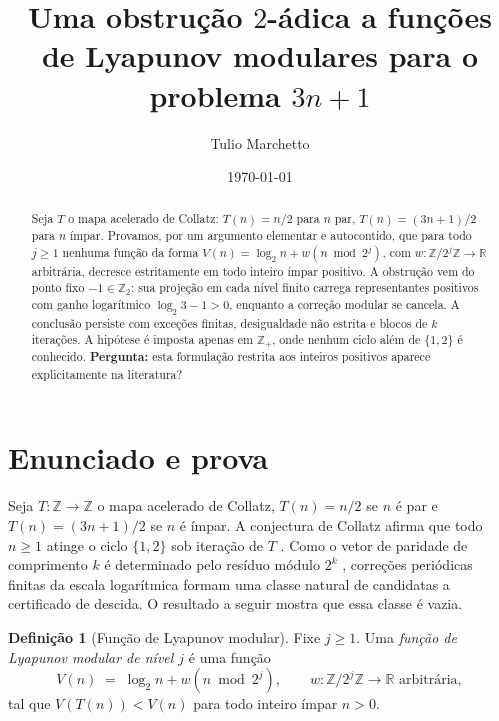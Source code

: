 \documentclass[10pt]{amsart}
\theoremstyle{definition}
\newtheorem{definition}[theorem]{Definição}
\theoremstyle{remark}
\newcommand{\Z}{\mathbb{Z}}
\newcommand{\R}{\mathbb{R}}
\begin{document}
\title[Obstrução $2$-ádica a funções de Lyapunov modulares]{Uma obstrução $2$-ádica a funções de Lyapunov modulares para o problema $3n+1$}

\author{Tulio Marchetto}

\date{\today}

\begin{abstract}
Seja $T$ o mapa acelerado de Collatz: $T(n)=n/2$ para $n$ par, $T(n)=(3n+1)/2$ para $n$ ímpar. Provamos, por um argumento elementar e autocontido, que para todo $j\ge 1$ nenhuma função da forma $V(n)=\log_2 n+w(n\bmod 2^j)$, com $w:\Z/2^j\Z\to\R$ arbitrária, decresce estritamente em todo inteiro ímpar positivo. A obstrução vem do ponto fixo $-1\in\Z_2$: sua projeção em cada nível finito carrega representantes positivos com ganho logarítmico $\log_2 3-1>0$, enquanto a correção modular se cancela. A conclusão persiste com exceções finitas, desigualdade não estrita e blocos de $k$ iterações. A hipótese é imposta apenas em $\Z_+$, onde nenhum ciclo além de $\{1,2\}$ é conhecido. \textbf{Pergunta:} esta formulação restrita aos inteiros positivos aparece explicitamente na literatura?
\end{abstract}

\maketitle

\section{Enunciado e prova}

Seja $T:\Z\to\Z$ o mapa acelerado de Collatz, $T(n)=n/2$ se $n$ é par e $T(n)=(3n+1)/2$ se $n$ é ímpar. A conjectura de Collatz afirma que todo $n\ge 1$ atinge o ciclo $\{1,2\}$ sob iteração de $T$ \cite{lagarias1985,lagarias2010}. Como o vetor de paridade de comprimento $k$ é determinado pelo resíduo módulo $2^k$ \cite{terras1976}, correções periódicas finitas da escala logarítmica formam uma classe natural de candidatas a certificado de descida. O resultado a seguir mostra que essa classe é vazia.

\begin{definition}[Função de Lyapunov modular]\label{def:lyap}
Fixe $j \ge 1$. Uma \emph{função de Lyapunov modular de nível $j$} é uma função
\[
V(n) \;=\; \log_2 n + w(n \bmod 2^j), \qquad w : \Z/2^j\Z \to \R \text{ arbitrária},
\]
tal que $V(T(n)) < V(n)$ para todo inteiro ímpar $n > 0$.
\end{definition}
\end{document}

